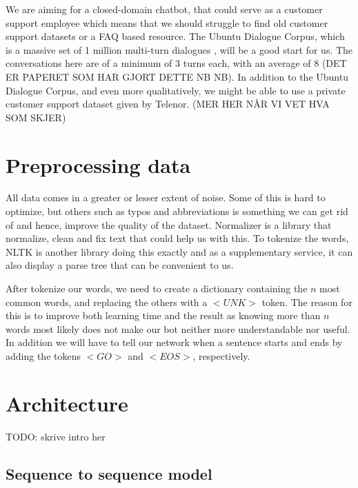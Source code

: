 \documentclass{article} %
\begin{document}
We are aiming for a closed-domain chatbot, that could serve as a customer support employee which means that we should struggle to find old customer support datasets or a FAQ based resource. The Ubuntu Dialogue Corpus, which is a massive set of 1 million multi-turn dialogues \cite{Lowe}, will be a good start for us. The conversations here are of a minimum of 3 turns each, with an average of 8 (DET ER PAPERET SOM HAR GJORT DETTE NB NB). In addition to the Ubuntu Dialogue Corpus, and even more qualitatively, we might be able to use a private customer support dataset given by Telenor. (MER HER NÅR VI VET HVA SOM SKJER)

\section{Preprocessing data}
All data comes in a greater or lesser extent of noise. Some of this is hard to optimize, but others such as typos and abbreviations is something we can get rid of and hence, improve the quality of the dataset. Normalizer \cite{Normalizer} is a library that normalize, clean and fix text that could help us with this. To tokenize the words, NLTK \cite{NLTK} is another library doing this exactly and as a supplementary service, it can also display a parse tree that can be convenient to us.

After tokenize our words, we need to create a dictionary containing the $n$ most common words, and replacing the others with a $<UNK>$ token. The reason for this is to improve both learning time and the result as knowing more than $n$ words most likely does not make our bot neither more understandable nor useful. In addition we will have to tell our network when a sentence starts and ends by adding the tokens $<GO>$ and $<EOS>$, respectively.

\section{Architecture}

TODO: skrive intro her

\subsection{Sequence to sequence model}
\end{document}
